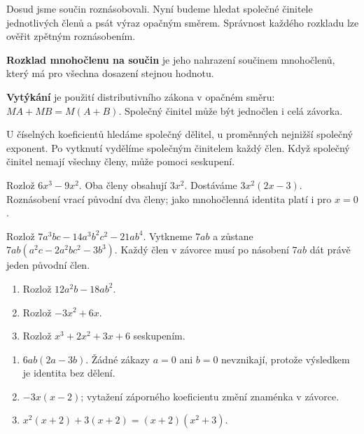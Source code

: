 \documentclass[11pt,a4paper]{article}
\begin{document}

Dosud jsme součin roznásobovali. Nyní budeme hledat společné činitele jednotlivých členů a psát výraz opačným směrem. Správnost každého rozkladu lze ověřit zpětným roznásobením.

\begin{definiceBox}[title={Definice},breakable=false]
\textbf{Rozklad mnohočlenu na součin} je jeho nahrazení součinem mnohočlenů, který má pro všechna dosazení stejnou hodnotu.
\end{definiceBox}


\begin{definiceBox}[title={Definice},breakable=false]
\textbf{Vytýkání} je použití distributivního zákona v opačném směru: $MA+MB=M(A+B)$. Společný činitel může být jednočlen i celá závorka.
\end{definiceBox}


U číselných koeficientů hledáme společný dělitel, u proměnných nejnižší společný exponent. Po vytknutí vydělíme společným činitelem každý člen. Když společný činitel nemají všechny členy, může pomoci seskupení.


\begin{prikladReseniBox}[title={Příklad 1},breakable=false]
Rozlož $6x^3-9x^2$.
\tcblower
Oba členy obsahují $3x^2$. Dostáváme $3x^2(2x-3)$. Roznásobení vrací původní dva členy; jako mnohočlenná identita platí i pro $x=0$.
\end{prikladReseniBox}


\begin{prikladReseniBox}[title={Příklad 2},breakable=false]
Rozlož $7a^3bc-14a^3b^2c^2-21ab^4$.
\tcblower
Vytkneme $7ab$ a zůstane $7ab(a^2c-2a^2bc^2-3b^3)$. Každý člen v závorce musí po násobení $7ab$ dát právě jeden původní člen.
\end{prikladReseniBox}



\begin{zadaniReseniBox}[title={Procvičení},breakable=false]
\begin{enumerate}[label=\alph*)]
\item Rozlož $12a^2b-18ab^2$.
\item Rozlož $-3x^2+6x$.
\item Rozlož $x^3+2x^2+3x+6$ seskupením.
\end{enumerate}
\tcblower
\begin{enumerate}[label=\alph*)]
\item $6ab(2a-3b)$. Žádné zákazy $a=0$ ani $b=0$ nevznikají, protože výsledkem je identita bez dělení.
\item $-3x(x-2)$; vytažení záporného koeficientu změní znaménka v závorce.
\item $x^2(x+2)+3(x+2)=(x+2)(x^2+3)$.
\end{enumerate}
\end{zadaniReseniBox}
\end{document}

